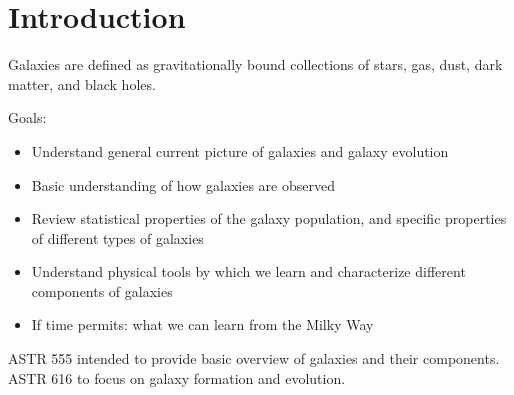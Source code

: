 \documentclass{article}
\begin{document}
\setlength{\parskip}{0pt}
\tableofcontents
\newpage
\setlength{\parskip}{10pt}
\hypersetup{colorlinks=true, urlcolor=myblue, linkcolor=pinegreen,}

\section{Introduction}
Galaxies are defined as gravitationally bound collections of stars,
gas, dust, dark matter, and black holes.

Goals:
\begin{itemize}
    \item Understand general current picture of galaxies and galaxy evolution
    \item Basic understanding of how galaxies are observed
    \item Review statistical properties of the galaxy population, and specific properties of different types of galaxies
    \item Understand physical tools by which we learn and characterize different components of galaxies
    \item If time permits: what we can learn from the Milky Way
\end{itemize}

ASTR 555 intended to provide basic overview of galaxies and their components.
ASTR 616 to focus on galaxy formation and evolution.
\end{document}
